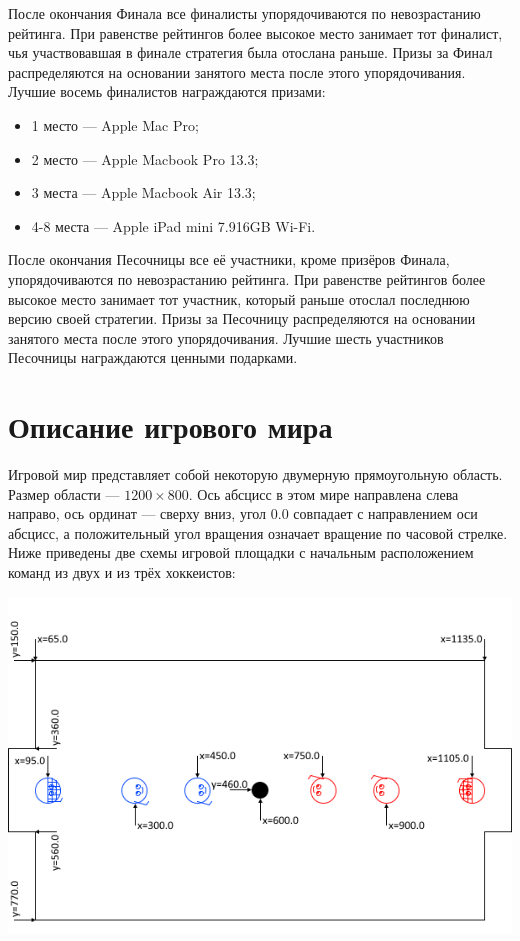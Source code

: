 После окончания Финала все финалисты упорядочиваются по невозрастанию рейтинга. При равенстве рейтингов более высокое место занимает тот
финалист, чья участвовавшая в финале стратегия была отослана раньше. Призы за Финал распределяются на основании занятого места после этого
упорядочивания. Лучшие восемь финалистов награждаются призами:
\begin{itemize}
\item 1 место --- Apple Mac Pro;
\item 2 место --- Apple Macbook Pro 13.3\textquotedbl;
\item 3 места --- Apple Macbook Air 13.3\textquotedbl;
\item 4-8 места --- Apple iPad mini 7.9\textquotedbl 16GB Wi-Fi.
\end{itemize}

После окончания Песочницы все её участники, кроме призёров Финала, упорядочиваются по невозрастанию рейтинга. При равенстве рейтингов более
высокое место занимает тот участник, который раньше отослал последнюю версию своей стратегии. Призы за Песочницу распределяются на основании
занятого места после этого упорядочивания. Лучшие шесть участников Песочницы награждаются ценными подарками.

\section{Описание игрового мира}

Игровой мир представляет собой некоторую двумерную прямоугольную область. Размер области --- $1200\times800$. Ось абсцисс в этом мире
направлена слева направо, ось ординат --- сверху вниз, угол $0.0$ совпадает с направлением оси абсцисс, а положительный угол вращения
означает вращение по часовой стрелке. Ниже приведены две схемы игровой площадки с начальным расположением команд из двух и из трёх
хоккеистов:

\includegraphics{images/FieldScheme-2vs2-1200x800.png}

